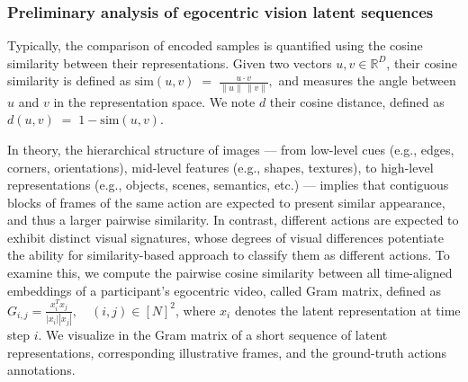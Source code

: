 \subsubsection{Preliminary analysis of egocentric vision latent sequences}
\label{sec:chapter_4_preliminary_analysis_egocentric_latent_sequences}
Typically, the comparison of encoded samples is quantified using the cosine similarity between their representations. Given two vectors $u, v \in \mathbb{R}^D$, their cosine similarity is defined as $\text{sim}(u,v) \;=\; \frac{u \cdot v}{\lVert u \rVert \,\lVert v \rVert},$  and measures the angle between $u$ and $v$ in the representation space. We note $d$ their cosine distance, defined as $d(u,v) \;=\; 1 - \text{sim}(u,v)$. 

In theory, the hierarchical structure of images — from low-level cues (e.g., edges, corners, orientations), mid-level features (e.g., shapes, textures), to high-level representations (e.g., objects, scenes, semantics, etc.) — implies that contiguous blocks of frames of the same action are expected to present similar appearance, and thus a larger pairwise similarity. In contrast, different actions are expected to exhibit distinct visual signatures, whose degrees of visual differences potentiate the ability for similarity-based approach to classify them as different actions. To examine this, we compute the pairwise cosine similarity between all time-aligned embeddings of a participant’s egocentric video, called Gram matrix, defined as $G_{i,j} = \tfrac{x_i^Tx_j}{|x_i||x_j|}, \quad (i, j) \in [N]^2 $, where $x_i$ denotes the latent representation at time step $i$. We visualize in  the Gram matrix of a short sequence of latent representations, corresponding illustrative frames, and the ground-truth actions annotations.  %

